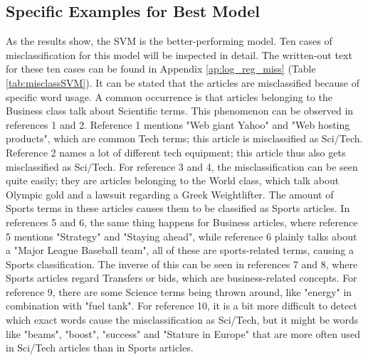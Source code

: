 \documentclass[12pt,a4paper,english]{article}
\begin{document}
\subsection{Specific Examples for Best Model}
As the results show, the SVM is the better-performing model. Ten cases of misclassification for this model will be inspected in detail. The written-out text for these ten cases can be found in Appendix \ref{ap:log_reg_miss} (Table \ref{tab:misclassSVM}). It can be stated that the articles are misclassified because of specific word usage. A common occurrence is that articles belonging to the Business class talk about Scientific terms. This phenomenon can be observed in references 1 and 2. Reference 1 mentions "Web giant Yahoo" and "Web hosting products", which are common Tech terms; this article is misclassified as Sci/Tech. Reference 2 names a lot of different tech equipment; this article thus also gets misclassified as Sci/Tech. For reference 3 and 4, the misclassification can be seen quite easily; they are articles belonging to the World class, which talk about Olympic gold and a lawsuit regarding a Greek Weightlifter. The amount of Sports terms in these articles causes them to be classified as Sports articles. In references 5 and 6, the same thing happens for Business articles, where reference 5 mentions "Strategy" and "Staying ahead", while reference 6 plainly talks about a "Major League Baseball team", all of these are sports-related terms, causing a Sports classification. The inverse of this can be seen in references 7 and 8, where Sports articles regard Transfers or bids, which are business-related concepts. For reference 9, there are some Science terms being thrown around, like "energy" in combination with "fuel tank". For reference 10, it is a bit more difficult to detect which exact words cause the misclassification as Sci/Tech, but it might be words like "beams", "boost", "success" and "Stature in Europe" that are more often used in Sci/Tech articles than in Sports articles.
\end{document}
